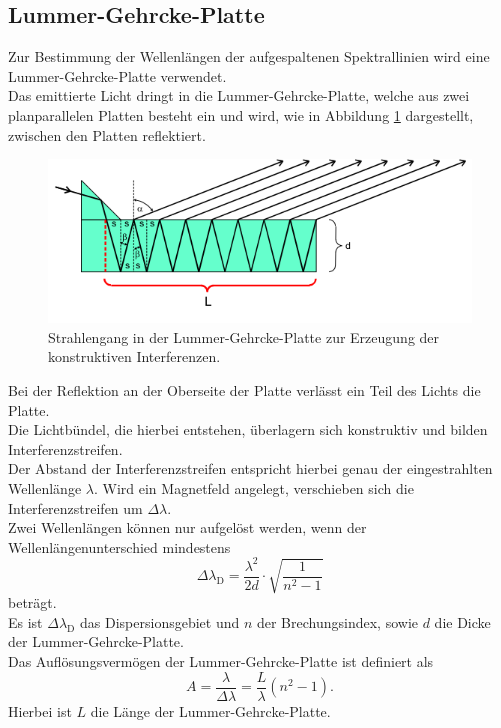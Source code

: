 \subsection{Lummer-Gehrcke-Platte}
Zur Bestimmung der Wellenlängen der aufgespaltenen Spektrallinien wird eine Lummer-Gehrcke-Platte verwendet.\\
Das emittierte Licht dringt in die Lummer-Gehrcke-Platte, welche aus zwei planparallelen Platten besteht ein und wird, wie in Abbildung \ref{fig:lummer} dargestellt, zwischen den Platten reflektiert.\\
\begin{figure}
  \centering
  \includegraphics[width=0.7\columnwidth]{pictures/lummer.png}
  \caption{Strahlengang in der Lummer-Gehrcke-Platte zur Erzeugung der konstruktiven Interferenzen.\cite{Anleitung}}
  \label{fig:lummer}
\end{figure}
Bei der Reflektion an der Oberseite der Platte verlässt ein Teil des Lichts die Platte.\\
Die Lichtbündel, die hierbei entstehen, überlagern sich konstruktiv und bilden Interferenzstreifen.\\ Der Abstand der Interferenzstreifen entspricht hierbei genau der eingestrahlten Wellenlänge $\lambda$.
Wird ein Magnetfeld angelegt, verschieben sich die Interferenzstreifen um $\Delta \lambda$.\\

Zwei Wellenlängen können nur aufgelöst werden, wenn der Wellenlängenunterschied mindestens
\begin{equation}
  \label{eqn:dispersionsgebiet}
	\Delta \lambda_{\mathrm{D}} = \frac{\lambda^2}{2d} \cdot \sqrt{\frac{1}{n^2 - 1}}
\end{equation}
beträgt.\\
Es ist $\Delta \lambda_{\mathrm{D}}$ das Dispersionsgebiet und $n$ der Brechungsindex, sowie $d$ die Dicke der Lummer-Gehrcke-Platte.\\
Das Auflösungsvermögen der Lummer-Gehrcke-Platte ist definiert als
\begin{equation}
  \label{eqn:A}
  A=\frac{\lambda}{\Delta \lambda}=\frac{L}{\lambda}\left(n^2-1\right)\mathrm{.}
\end{equation}
Hierbei ist $L$ die Länge der Lummer-Gehrcke-Platte.
